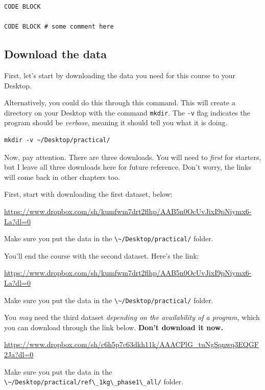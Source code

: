 \documentclass[
]{book}
\newcommand{\passthrough}[1]{#1}
\begin{document}
\begin{lstlisting}
CODE BLOCK

CODE BLOCK # some comment here
\end{lstlisting}

\hypertarget{download-the-data}{%
\subsection{Download the data}\label{download-the-data}}

First, let's start by downloading the data you need for this course to your Desktop.

Alternatively, you could do this through this command. This will create a directory on your Desktop with the command \passthrough{\lstinline!mkdir!}. The \passthrough{\lstinline!-v!} flag indicates the program should be \emph{verbose}, meaning it should tell you what it is doing.

\begin{lstlisting}
mkdir -v ~/Desktop/practical/
\end{lstlisting}

Now, pay attention. There are three downloads. You will need to \emph{first} for starters, but I leave all three downloads here for future reference. Don't worry, the links will come back in other chapters too.

First, start with downloading the first dataset, below:

\url{https://www.dropbox.com/sh/kumfwm7drt2flhp/AAB5n0OcUvJixI9pNiymx6-La?dl=0}

Make sure you put the data in the \passthrough{\lstinline!\~/Desktop/practical/!} folder.

You'll end the course with the second dataset. Here's the link:

\url{https://www.dropbox.com/sh/kumfwm7drt2flhp/AAB5n0OcUvJixI9pNiymx6-La?dl=0}

Make sure you put the data in the \passthrough{\lstinline!\~/Desktop/practical/!} folder.

You \emph{may} need the third dataset \emph{depending on the availability of a program}, which you can download through the link below. \textbf{Don't download it now.}

\url{https://www.dropbox.com/sh/c6h5p7c63dkh11k/AAACPlG_tuNgSqnwq3EQGF2Ja?dl=0}

Make sure you put the data in the \passthrough{\lstinline!\~/Desktop/practical/ref\_1kg\_phase1\_all/!} folder.
\end{document}
